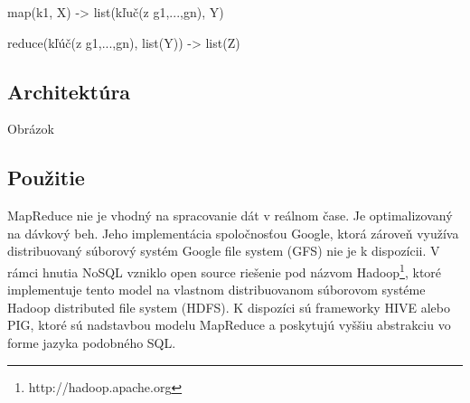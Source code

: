 \documentclass[11pt,twoside,a4paper]{book}
\begin{document}
map(k1, X) -> list(kľuč(z g1,...,gn), Y)

reduce(kľúč(z g1,...,gn), list(Y)) -> list(Z)


\subsection{Architektúra}
Obrázok

\subsection{Použitie}

MapReduce nie je vhodný na spracovanie dát v reálnom čase. Je optimalizovaný na dávkový beh. Jeho implementácia spoločnosťou Google, ktorá zároveň využíva distribuovaný súborový systém Google file system (GFS) nie je k dispozícii. V rámci hnutia NoSQL vzniklo open source riešenie pod názvom Hadoop\footnote{http://hadoop.apache.org}, ktoré implementuje tento model na vlastnom distribuovanom súborovom systéme Hadoop distributed file system (HDFS). K dispozíci sú frameworky HIVE alebo PIG, ktoré sú nadstavbou modelu MapReduce a poskytujú vyššiu abstrakciu vo forme jazyka podobného SQL.


% 

% 
\end{document}
